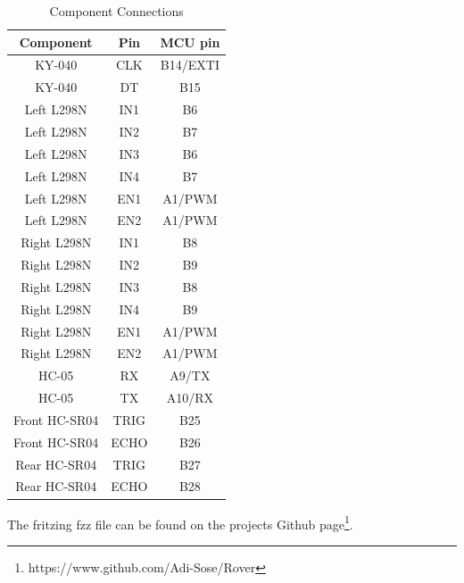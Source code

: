 \begin{table}[htbp]
    \caption{Component Connections}
    \begin{center}
        \begin{tabular}{|c|c|c|}
            \hline
            \textbf{Component} & \textbf{Pin} & \textbf{MCU pin}\\
            \hline
            KY-040 & CLK & B14/EXTI\\
            \hline
            KY-040 & DT & B15\\
            \hline
            Left L298N & IN1 & B6\\
            \hline
            Left L298N & IN2 & B7\\
            \hline
            Left L298N & IN3 & B6\\
            \hline
            Left L298N & IN4 & B7\\
            \hline
            Left L298N & EN1 & A1/PWM\\
            \hline
            Left L298N & EN2 & A1/PWM\\
            \hline
            Right L298N & IN1 & B8\\
            \hline
            Right L298N & IN2 & B9\\
            \hline
            Right L298N & IN3 & B8\\
            \hline
            Right L298N & IN4 & B9\\
            \hline
            Right L298N & EN1 & A1/PWM\\
            \hline
            Right L298N & EN2 & A1/PWM\\
            \hline
            HC-05 & RX & A9/TX\\
            \hline
            HC-05 & TX & A10/RX\\
            \hline
            Front HC-SR04 & TRIG & B25\\
            \hline
            Front HC-SR04 & ECHO & B26\\
            \hline
            Rear HC-SR04 & TRIG & B27\\
            \hline
            Rear HC-SR04 & ECHO & B28\\
            \hline
        \end{tabular}
        \label{tab4}
    \end{center}
\end{table}

The fritzing fzz file can be found on the projects Github page\footnote{https://www.github.com/Adi-Sose/Rover}.